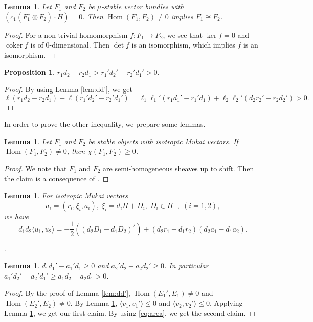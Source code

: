 \documentclass[10pt]{amsart}
\newenvironment{NB}{
\color{red}{\bf NB}. \footnotesize 
}{}
\newcommand{\Hom}{\operatorname{Hom}}
\newcommand{\coker}{\operatorname{coker}}
\numberwithin{equation}{section}
\theoremstyle{plain}
\newtheorem{lem}[thm]{Lemma}
\newtheorem{prop}[thm]{Proposition}
\theoremstyle{definition}
\theoremstyle{remark}
\begin{document}
\begin{lem}\label{lem:mu-s}
Let $F_1$ and $F_2$ be $\mu$-stable vector bundles with
$(c_1(F_1^{\vee} \otimes F_2) \cdot H)=0$.
Then $\Hom(F_1,F_2) \ne 0$ implies $F_1 \cong F_2$.
\end{lem}

\begin{proof}
For a non-trivial homomorphism $f:F_1 \to F_2$,
we see that $\ker f=0$ and $\coker f$ is of 0-dimensional.  
Then $\det f$ is an isomorphism, which implies $f$ is an isomorphism.
\end{proof}

\begin{prop}
$r_1d_2-r_2 d_1>r_1' d_2'-r_2' d_1'>0$.
\end{prop}

\begin{proof}
By using Lemma \ref{lem:dd'}, we get
\begin{equation}\label{eq:area}
\ell(r_1d_2-r_2 d_1)-\ell(r_1' d_2'-r_2' d_1')=\ell_1 \ell_1'(r_1 d_1'-r_1' d_1)+\ell_2 \ell_2'(d_2 r_2'-r_2 d_2')>0.
\end{equation}
\end{proof}



In order to prove the other inequality, we prepare some lemmas.

\begin{lem}\label{lem:chi}
Let $F_1$ and $F_2$ be stable objects with 
isotropic Mukai vectors.
If $\Hom(F_1,F_2) \ne 0$, then $\chi(F_1,F_2) \geq 0$.
\end{lem}

\begin{proof}
We note that $F_1$ and $F_2$ are semi-homogeneous sheaves up to shift.
Then the claim is a consequence of \cite[Prop. 4.4]{Y:abel}.
\end{proof}


\begin{lem}\label{lem:uu}
For isotropic Mukai vectors
$$
u_i=(r_i,\xi_i,a_i),\; \xi_i=d_i H+D_i,\; D_i \in H^\perp, \; (i=1,2),
$$
we have
\begin{equation}
d_1 d_2 \langle u_1,u_2 \rangle=-\frac{1}{2}((d_2 D_1-d_1 D_2)^2)+(d_2 r_1-d_1 r_2)(d_2 a_1-d_1 a_2).
\end{equation}
\end{lem}

\begin{NB}
\begin{lem}
$d_1 d_1'-a_1' d_1 \geq 0$ and $a_2' d_2-a_2 d_2' \geq 0$.
In particular 
$a_1' d_2'-a_2' d_1' \geq a_1 d_2-a_2 d_1>0$.
\end{lem}

\begin{proof}
By the proof of Lemma \ref{lem:dd'},
$\Hom(E_1',E_1) \ne 0$ and $\Hom(E_2',E_2) \ne 0$.
By Lemma \ref{lem:chi}, 
$\langle v_1,v_1' \rangle \leq 0$ and $\langle v_2,v_2' \rangle \leq 0$.
Applying Lemma \ref{lem:uu},
we get our first claim.
By using \eqref{eq:area}, we get the second claim.
\end{proof}
\end{NB}
\end{document}
